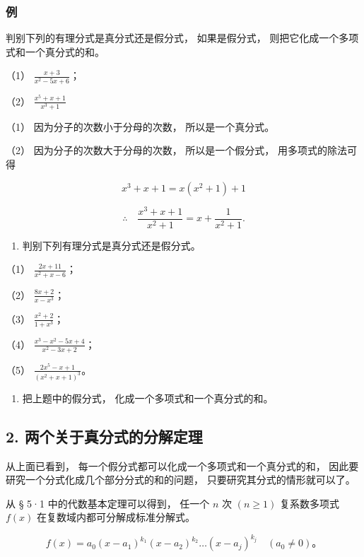 \subsubsection{例}

判别下列的有理分式是真分式还是假分式， 如果是假分式，
则把它化成一个多项式和一个真分式的和。

（1） \(\frac{x + 3}{x^2 - 5x + 6}\)；

（2） \(\frac{x^5 + x + 1}{x^3 + 1}\)

 （1） 因为分子的次数小于分母的次数， 所以是一个真分式。

（2） 因为分子的次数大于分母的次数， 所以是一个假分式，
用多项式的除法可得

\[
x ^ {3} + x + 1 = x (x ^ {2} + 1) + 1
\]

\[
\therefore \quad \frac {x ^ {3} + x + 1}{x ^ {2} + 1} = x + \frac {1}{x ^ {2} + 1}.
\]

\begin{enumerate}
\item
  判别下列有理分式是真分式还是假分式。
\end{enumerate}

（1） \(\frac{2x + 11}{x^2 + x - 6}\)；

（2） \(\frac{8x + 2}{x - x^3}\)；

（3） \(\frac{x^2 + 2}{1 + x^3}\)；

（4） \(\frac{x^3 - x^2 - 5x + 4}{x^2 - 3x + 2}\)；

（5） \(\frac{2x^5 - x + 1}{(x^2 + x + 1)^3}\)。

\begin{enumerate}[start=2]
\item
  把上题中的假分式， 化成一个多项式和一个真分式的和。
\end{enumerate}

\subsection{2. 两个关于真分式的分解定理}

从上面已看到， 每一个假分式都可以化成一个多项式和一个真分式的和，
因此要研究一个分式化成几个部分分式的和的问题，
只要研究其分式的情形就可以了。

从 § 5·1 中的代数基本定理可以得到， 任一个 \(n\) 次 \((n \geqslant 1)\)
复系数多项式 \(f(x)\) 在复数域内都可分解成标准分解式。

\[
f (x) = a _ {0} \left(x - a _ {1}\right) ^ {k _ {1}} \left(x - a _ {2}\right) ^ {k _ {2}} \dots \left(x - a _ {j}\right) ^ {k _ {j}} \quad (a _ {0} \neq 0)\text{。}
\]

